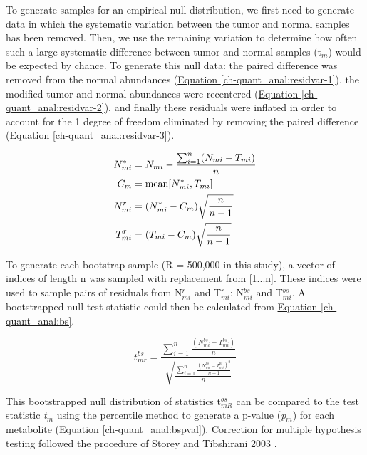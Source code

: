 To generate samples for an empirical null distribution, we first need to generate data in which the systematic variation between the tumor and normal samples has been removed. Then, we use the remaining variation to determine how often such a large systematic difference between tumor and normal samples (t$_{m}$) would be expected by chance.  To generate this null data: the paired difference was removed from the normal abundances (\hyperref[ch-quant_anal:residvar-1]{Equation \ref{ch-quant_anal:residvar-1}}), the modified tumor and normal abundances were recentered (\hyperref[ch-quant_anal:residvar-2]{Equation \ref{ch-quant_anal:residvar-2}}), and finally these residuals were inflated in order to account for the 1 degree of freedom eliminated by removing the paired difference (\hyperref[ch-quant_anal:residvar-3]{Equation \ref{ch-quant_anal:residvar-3}}).

\begin{subequations}
\begin{align}
N^{*}_{mi} &= N_{mi} - \frac{\sum_{i = 1}^{n}(N_{mi} - T_{mi})}{n}\label{ch-quant_anal:residvar-1}\\
C_{m} &= \text{mean}[N^{*}_{mi}, T_{mi}]\label{ch-quant_anal:residvar-2}\\
N^{r}_{mi} &= (N^{*}_{mi} - C_{m})\sqrt{\frac{n}{n - 1}}\notag\\
T^{r}_{mi} &= (T_{mi} - C_{m})\sqrt{\frac{n}{n - 1}}\label{ch-quant_anal:residvar-3}
\end{align}
\end{subequations}


To generate each bootstrap sample (R = 500,000 in this study), a vector of indices of length n was sampled with replacement from [1...n]. These indices were used to sample pairs of residuals from N$^{r}_{mi}$ and T$^{r}_{mi}$: N$^{bs}_{mi}$ and T$^{bs}_{mi}$.  A bootstrapped null test statistic could then be calculated from \hyperref[ch-quant_anal:bs]{Equation \ref{ch-quant_anal:bs}}.

\begin{equation}
t^{bs}_{mr} = \frac{\sum_{i = 1}^{n}\frac{(N^{bs}_{mi} - T^{bs}_{mi})}{n}}{\sqrt{\frac{\sum_{i = 1}^{n}\frac{(N^{bs}_{mi} - T^{bs}_{mi})^{2}}{n-1}}{n}}}\label{ch-quant_anal:bs}
\end{equation}

This bootstrapped null distribution of statistics t$^{bs}_{mR}$ can be compared to the test statistic \textit{t}$_{m}$ using the percentile method to generate a p-value (\textit{p}$_{m}$) for each metabolite (\hyperref[ch-quant_anal:bspval]{Equation \ref{ch-quant_anal:bspval}}). Correction for multiple hypothesis testing followed the procedure of Storey and Tibshirani 2003 \cite{Storey:2003cj}.

